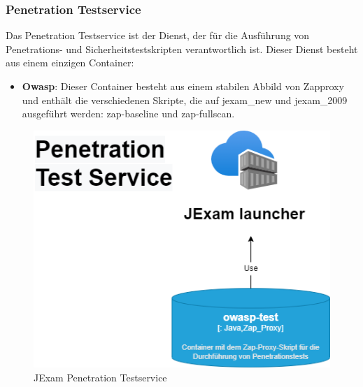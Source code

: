 \subsubsection{Penetration Testservice}

Das Penetration Testservice ist der Dienst, der für die Ausführung
von Penetrations- und Sicherheitstestskripten verantwortlich ist.
Dieser Dienst besteht aus einem einzigen Container:

\begin{itemize}
    \setlength\itemsep{1em}

    \item[] \textbf{Owasp}: Dieser Container besteht aus einem
    stabilen Abbild von Zapproxy und enthält die verschiedenen
    Skripte, die auf \gls{jexam_new} und \gls{jexam_2009}
    ausgeführt werden: zap-baseline und zap-fullscan.

\end{itemize}

\begin{figure}[H]
    \centering
    \includegraphics[scale=0.6]{images/penetration.drawio}
    \caption{JExam Penetration Testservice} \label{fig:pen}
\end{figure}
